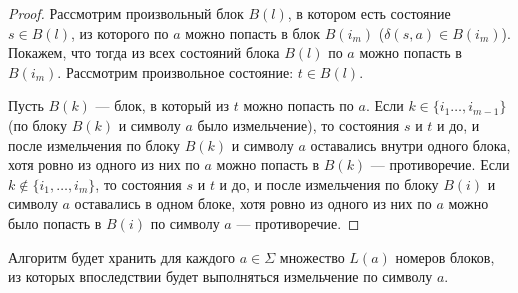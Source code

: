 \documentclass{article}
\begin{document}
\begin{proof}
    Рассмотрим произвольный блок $B(l)$, в котором есть состояние $s \in B(l)$, из которого по $a$ можно попасть в блок $B(i_m)$ ($\delta(s, a) \in B(i_m)$). Покажем, что тогда из всех состояний блока $B(l)$ по $a$ можно попасть в $B(i_m)$. Рассмотрим произвольное состояние: $t \in B(l)$.

    Пусть $B(k)$ --- блок, в который из $t$ можно попасть по $a$. Если $k \in \{i_1 \dots, i_{m-1}\}$ (по блоку $B(k)$ и символу $a$ было измельчение), то состояния $s$ и $t$ и до, и после измельчения по блоку $B(k)$ и символу $a$ оставались внутри одного блока, хотя ровно из одного из них по $a$ можно попасть в $B(k)$ --- противоречие. Если $k \notin \{i_1, \dots, i_m\}$, то состояния $s$ и $t$ и до, и после измельчения по блоку $B(i)$ и символу $a$ оставались в одном блоке, хотя ровно из одного из них по $a$ можно было попасть в $B(i)$ по символу $a$ --- противоречие.
\end{proof}
Алгоритм будет хранить для каждого $a \in \Sigma$ множество $L(a)$ номеров блоков, из которых впоследствии будет выполняться измельчение по символу $a$.
\end{document}
